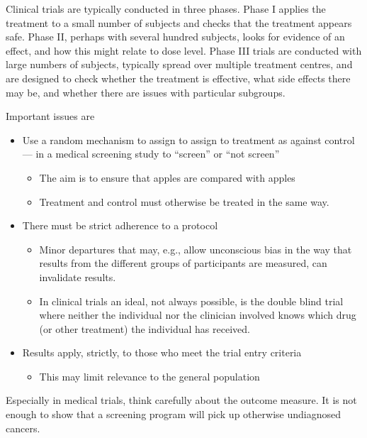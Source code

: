 \documentclass[
  10pt,
  b5paper]{book}
\providecommand{\tightlist}{%
  \setlength{\itemsep}{0pt}\setlength{\parskip}{0pt}}
\begin{document}
Clinical trials are typically conducted in three phases.
Phase I applies the treatment to a small number of subjects
and checks that the treatment appears safe.
Phase II, perhaps with several hundred subjects, looks for
evidence of an effect, and how this might relate to dose level.
Phase III trials are conducted with large numbers of subjects,
typically spread over multiple treatment centres, and are
designed to check whether the treatment is effective, what
side effects there may be, and whether there are issues with
particular subgroups.

Important issues are

\begin{itemize}
\tightlist
\item
  Use a random mechanism to assign to assign to treatment as
  against control --- in a medical screening study to
  ``screen'' or ``not screen''

  \begin{itemize}
  \tightlist
  \item
    The aim is to ensure that apples are compared with apples
  \item
    Treatment and control must otherwise be treated in the
    same way.
  \end{itemize}
\item
  There must be strict adherence to a protocol

  \begin{itemize}
  \tightlist
  \item
    Minor departures that may, e.g., allow unconscious bias
    in the way that results from the different groups of participants
    are measured, can invalidate results.
  \item
    In clinical trials an ideal, not always possible, is the double
    blind trial where neither the individual nor the clinician
    involved knows which drug (or other treatment)
    the individual has received.
  \end{itemize}
\item
  Results apply, strictly, to those who meet the trial entry criteria

  \begin{itemize}
  \tightlist
  \item
    This may limit relevance to the general population
  \end{itemize}
\end{itemize}

Especially in medical trials, think carefully about the outcome measure.
It is not enough to show that a screening program will pick up otherwise
undiagnosed cancers.
\end{document}
